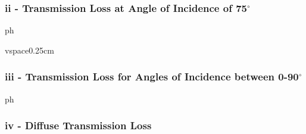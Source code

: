 {{{\subsubsection*{ii - Transmission Loss at Angle of Incidence of 75$^\circ$}

ph

vspace{0.25cm}
\subsubsection*{iii - Transmission Loss for Angles of Incidence between 0-90$^\circ$}

ph

\vspace{0.25cm}
\subsubsection*{iv - Diffuse Transmission Loss}







}}}

